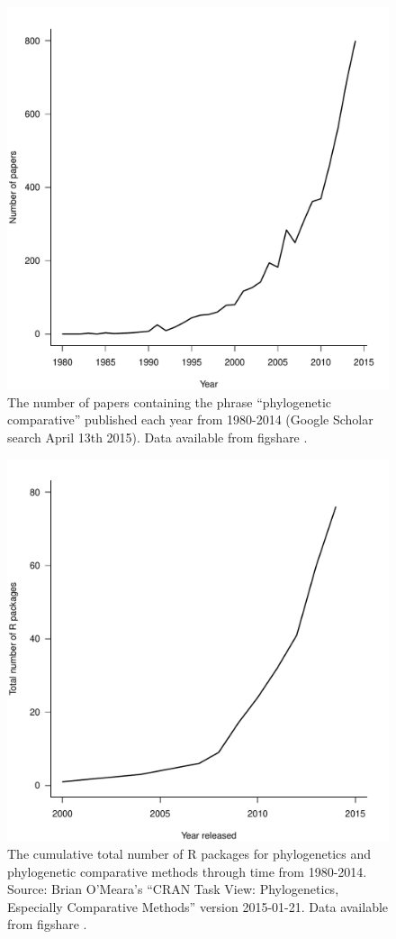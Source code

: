 \documentclass[a4paper,12pt]{article}
\begin{document}
  \begin{figure}[!htbp]
    \centering
      \includegraphics[width=12cm]{Figures/PCMCitations.pdf}
      \caption{The number of papers containing the phrase ``phylogenetic comparative'' published each year from 1980-2014 (Google Scholar search April 13th 2015). Data available from figshare \citep{coopermeedata}.}
      \label{PCMCitations}
  \end{figure}

\newpage
  \begin{figure}[!htbp]
    \centering
      \includegraphics[width=12cm]{Figures/PCMRpackages.pdf}
      \caption{The cumulative total number of R packages for phylogenetics and phylogenetic comparative methods through time from 1980-2014. Source: Brian O'Meara's ``CRAN Task View: Phylogenetics, Especially Comparative Methods'' version 2015-01-21. Data available from figshare \citep{coopermeedata}.}
      \label{PCMRpackages}
  \end{figure}
\end{document}
